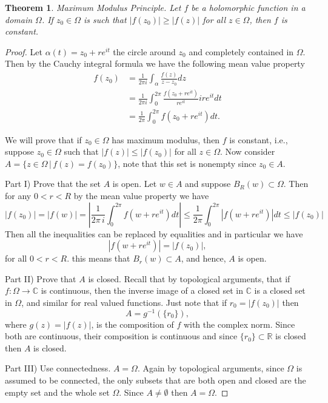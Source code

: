 \documentclass{amsart}
\newtheorem{thm}{Theorem}
\begin{document}
\begin{thm}
\alert{Maximum Modulus Principle}. Let \(f\) be a holomorphic function in a domain \(\Omega\). If \(z_0\in \Omega\) is such that \(|f(z_0)| \geq |f(z)|\) for all \(z\in \Omega\), then  \(f\) is constant.
\end{thm}
\begin{proof}


Let \(\alpha(t) = z_0 + re^{it}\) the circle around \(z_0\) and completely contained in \(\Omega\). Then by the Cauchy integral formula we have the following mean value property
\begin{align*}
f(z_0) &= \frac{1}{2\pi i} \int_{\alpha} \frac{ f(z)}{z - z_0} dz \\
& = \frac{1}{2\pi i} \int_{0}^{2\pi} \frac{ f(z_0 + re^{it})}{re^{it}} ire^{it}dt \\
& = \frac{1}{2\pi } \int_{0}^{2\pi} f(z_0 + re^{it})dt.
\end{align*}

We will prove that if \(z_0\in \Omega\) has maximum modulus, then \(f\) is constant, i.e.,  suppose \(z_0 \in \Omega\) such that \(|f(z) | \leq |f(z_0)|\) for all \(z\in \Omega\). Now consider \(A = \{ z\in \Omega \, | \, f(z) = f(z_0) \}\), note that this set is nonempty since \(z_0 \in A\).

Part I) \alert{Prove that the set \(A\)  is open}. Let \(w \in A\) and suppose \(B_R(w) \subset \Omega\). Then for any \(0 < r < R\) by the mean value property we have
\[ |f(z_0)| = |f(w)| = \left|\frac{1}{2\pi\,i}\int_{0}^{2\pi} f(w + re^{it})dt \right| \leq  \frac{1}{2\pi } \int_{0}^{2\pi} \left|f(w + re^{it})\right| dt \leq |f(z_0)| \]
Then all the inequalities can be replaced by equalities and in particular we have
\[ |f(w + re^{it})| = |f(z_0)|,\]
for all \(0 < r < R\). this means that \(B_r(w) \subset A\), and hence, \(A\) is open.

Part II) \alert{Prove that \(A\) is closed}. Recall that by topological arguments, that if \(f:\Omega \to \mathbb{C}\) is continuous, then the inverse image of a closed set in \(\mathbb{C}\) is a closed set in \(\Omega\), and similar for real valued functions. Just note that if \(r_0 = |f(z_0)|\) then
\[ A = g^{-1}(\{r_0\}), \]
where \(g(z) = |f(z)|\), is the composition of \(f\) with the complex norm. Since both are continuous, their composition is continuous and since \(\{r_0\}\subset\mathbb{R}\) is closed then \(A\) is closed.

Part III) \alert{Use connectedness}. \(A = \Omega\). Again by topological arguments, since \(\Omega\) is assumed to be connected, the only subsets that are both open and closed are the empty set and the whole set \(\Omega\). Since \(A \neq \emptyset\) then \(A=\Omega\).
\end{proof}
\end{document}
